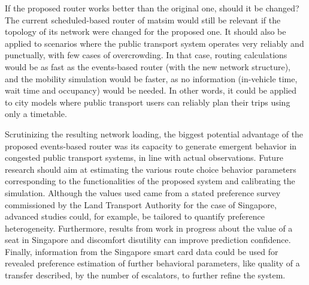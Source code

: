If the proposed router works better than the original one, should it be changed? The current scheduled-based router of \gls{matsim} would still be relevant if the topology of its network were changed for the proposed one. It should also be applied to scenarios where the public transport system operates very reliably and punctually, with few cases of overcrowding. In that case, routing calculations would be as fast as the events-based router (with the new network structure), and the mobility simulation would be faster, as no information (in-vehicle time, wait time and occupancy) would be needed. In other words, it could be applied to city models where public transport users can reliably plan their trips using only a timetable.

Scrutinizing the resulting network loading, the biggest potential advantage of the proposed events-based router was its capacity to generate emergent behavior in congested public transport systems, in line with actual observations. Future research should aim at estimating the various route choice behavior parameters corresponding to the functionalities of the proposed system and calibrating the simulation. Although the values used came from a stated preference survey commissioned by the Land Transport Authority for the case of Singapore, advanced studies could, for example, be tailored to quantify preference heterogeneity. Furthermore, results from work in progress about the value of a seat in Singapore and discomfort disutility can improve prediction confidence. Finally, information from the Singapore smart card data could be used for revealed preference estimation of further behavioral parameters, like quality of a transfer described, \eg by the number of escalators, to further refine the system.





